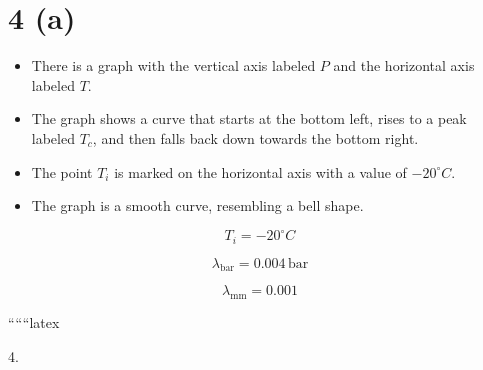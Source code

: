 \section*{4 (a)}

\begin{itemize}
    \item There is a graph with the vertical axis labeled \( P \) and the horizontal axis labeled \( T \).
    \item The graph shows a curve that starts at the bottom left, rises to a peak labeled \( T_c \), and then falls back down towards the bottom right.
    \item The point \( T_i \) is marked on the horizontal axis with a value of \( -20^\circ C \).
    \item The graph is a smooth curve, resembling a bell shape.
\end{itemize}

\[
T_i = -20^\circ C
\]

\[
\lambda_{\text{bar}} = 0.004 \, \text{bar}
\]

\[
\lambda_{\text{mm}} = 0.001
\]

``````latex


4.